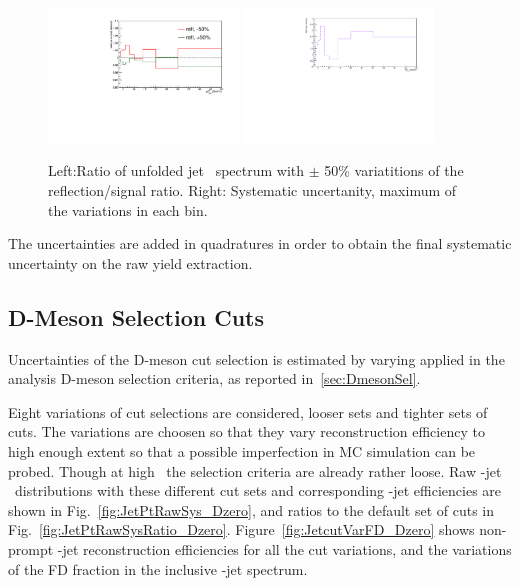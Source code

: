 \begin{figure}[bth]
\begin{center}
\includegraphics[width=0.45\textwidth]{pPbcuts_2sig/reflections/RawYield_reflections_ratio.pdf}
\includegraphics[width=0.45\textwidth]{pPbcuts_2sig/reflections/RawYield_reflections_sys.pdf}
\caption{Left:Ratio of unfolded jet \pt\ spectrum with $\pm$ 50\% variatitions of the reflection/signal ratio. Right: Systematic uncertanity, maximum of the variations in each bin.} 
\label{fig:JetPtSys_Dzero_Refl}
\end{center}
\end{figure}


The uncertainties are added in quadratures in order to obtain the final systematic uncertainty on the raw yield extraction. 

\subsection{D-Meson Selection Cuts}
Uncertainties of the D-meson cut selection is estimated by varying applied in the analysis D-meson selection criteria, as reported in~\ref{sec:DmesonSel}. 

Eight variations of cut selections are considered, {} looser sets and {} tighter sets of cuts. The variations are choosen so that they vary \Dzero reconstruction efficiency to high enough extent so that a possible imperfection in MC simulation can be probed. Though at high \ptd\ the selection criteria are already rather loose.
Raw \Dzero-jet \pt\ distributions with these different cut sets and corresponding \Dzero-jet efficiencies are shown in Fig.~\ref{fig:JetPtRawSys_Dzero}, and ratios to the default set of cuts in Fig.~\ref{fig:JetPtRawSysRatio_Dzero}.
Figure~\ref{fig:JetcutVarFD_Dzero} shows non-prompt \Dzero-jet reconstruction efficiencies for all the cut variations, and the variations of the FD fraction in the inclusive \Dzero-jet spectrum.

